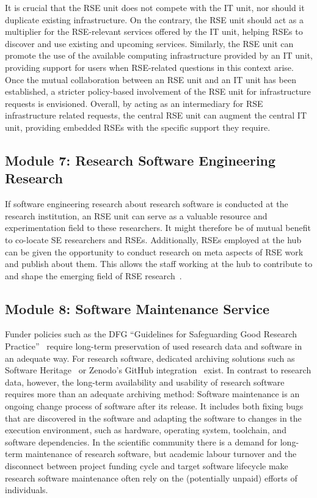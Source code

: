 \documentclass[10pt,letterpaper]{article}
\begin{document}
It is crucial that the RSE unit does not compete with the IT unit, nor should it duplicate existing infrastructure.
On the contrary, the RSE unit should act as a multiplier for the RSE-relevant services offered by the IT unit, helping RSEs to discover and use existing and upcoming services.
Similarly, the RSE unit can promote the use of the available computing infrastructure provided by an IT unit, providing support for users when RSE-related questions in this context arise.
Once the mutual collaboration between an RSE unit and an IT unit has been established, a stricter policy-based involvement of the RSE unit for infrastructure requests is envisioned.
Overall, by acting as an intermediary for RSE infrastructure related requests, the central RSE unit can augment the central IT unit, providing embedded RSEs with the specific support they require.

\subsection*{Module 7: Research Software Engineering Research}%
\label{sec:rseresearch}

If software engineering research about research software is conducted at the research institution, an RSE unit can serve as a valuable resource and experimentation field to these researchers.
It might therefore be of mutual benefit to co-locate SE researchers and RSEs.
Additionally, RSEs employed at the hub can be given the opportunity to conduct research on meta aspects of RSE work and publish about them.
This allows the staff working at the hub to contribute to and shape the emerging field of RSE research~\autocite{Felderer_2025}.

\subsection*{Module 8: Software Maintenance Service}%
\label{sec:maintenance}

Funder policies such as the DFG “Guidelines for Safeguarding Good Research Practice”~\autocite{dfg_gsp} require long-term preservation of used research data and software in an adequate way.
For research software, dedicated archiving solutions such as Software Heritage~\autocite{DiCosmo2020,DiCosmo2023} or Zenodo's GitHub integration~\autocite{GitHubZenodo} exist.
In contrast to research data, however, the long-term availability and usability of research software requires more than an adequate archiving method:
Software maintenance is an ongoing change process of software after its release.
It includes both fixing bugs that are discovered in the software and adapting the software to changes in the execution environment, such as hardware, operating system, toolchain, and software dependencies.
In the scientific community there is a demand for long-term maintenance of research software,
 but academic labour turnover and the disconnect between project funding cycle and target software lifecycle make research software maintenance often rely on the (potentially unpaid) efforts of individuals.
\end{document}
